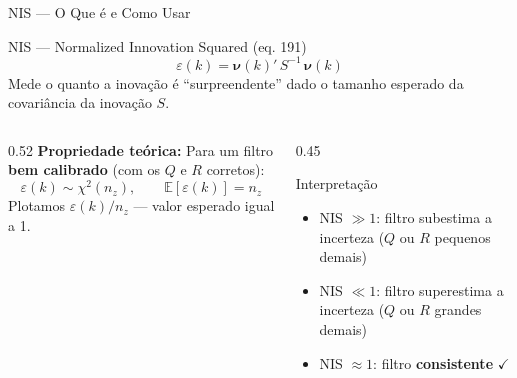 \documentclass[aspectratio=169]{beamer}
\begin{document}
\begin{frame}{NIS --- O Que é e Como Usar}
    \begin{block}{NIS --- Normalized Innovation Squared (eq. 191)}
        \[
            \varepsilon(k) = \boldsymbol{\nu}(k)'\,S^{-1}\,\boldsymbol{\nu}(k)
        \]
        Mede o quanto a inovação é ``surpreendente'' dado o tamanho esperado
        da covariância da inovação $S$.
    \end{block}
    \vspace{0.2cm}
    \begin{columns}[T]
        \begin{column}{0.52\textwidth}
            \textbf{Propriedade teórica:}
            Para um filtro \textbf{bem calibrado} (com os $Q$ e $R$ corretos):
            \[
                \varepsilon(k) \sim \chi^2(n_z), \qquad
                \mathbb{E}[\varepsilon(k)] = n_z
            \]
            Plotamos $\varepsilon(k)/n_z$ --- valor esperado igual a 1.
        \end{column}
        \begin{column}{0.45\textwidth}
            \begin{alertblock}{Interpretação}
                \begin{itemize}
                    \item NIS $\gg 1$: filtro subestima a incerteza
                          ($Q$ ou $R$ pequenos demais)
                    \item NIS $\ll 1$: filtro superestima a incerteza
                          ($Q$ ou $R$ grandes demais)
                    \item NIS $\approx 1$: filtro \textbf{consistente} $\checkmark$
                \end{itemize}
            \end{alertblock}
        \end{column}
    \end{columns}
\end{frame}
\end{document}
